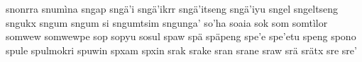 \documentclass[a4paper]{article}
\begin{document}
snonrra\hspace{2mm}
snumìna\hspace{2mm}
sngap\hspace{2mm}
sngä'i\hspace{2mm}
sngä'ikrr\hspace{2mm}
sngä'itseng\hspace{2mm}
sngä'iyu\hspace{2mm}
sngel\hspace{2mm}
sngeltseng\hspace{2mm}
sngukx\hspace{2mm}
sngum\hspace{2mm}
sngum si\hspace{2mm}
sngumtsim\hspace{2mm}
sngunga'\hspace{2mm}
so'ha\hspace{2mm}
soaia\hspace{2mm}
sok\hspace{2mm}
som\hspace{2mm}
somtìlor\hspace{2mm}
somwew\hspace{2mm}
somwewpe\hspace{2mm}
sop\hspace{2mm}
sopyu\hspace{2mm}
sosul\hspace{2mm}
spaw\hspace{2mm}
spä\hspace{2mm}
späpeng\hspace{2mm}
spe'e\hspace{2mm}
spe'etu\hspace{2mm}
speng\hspace{2mm}
spono\hspace{2mm}
spule\hspace{2mm}
spulmokri\hspace{2mm}
spuwin\hspace{2mm}
spxam\hspace{2mm}
spxin\hspace{2mm}
srak\hspace{2mm}
srake\hspace{2mm}
sran\hspace{2mm}
srane\hspace{2mm}
sraw\hspace{2mm}
srä\hspace{2mm}
srätx\hspace{2mm}
sre\hspace{2mm}
sre'\hspace{2mm}
\end{document}
